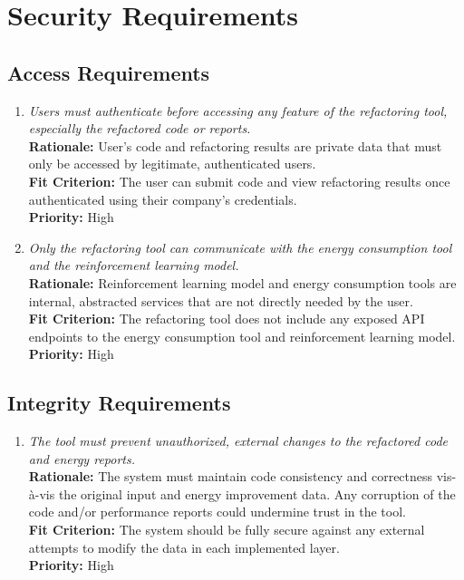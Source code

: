 \documentclass[12pt]{article}
\begin{document}
\section{Security Requirements}
\subsection{Access Requirements}
\begin{enumerate}[label=SR-AR \arabic*., wide=0pt, leftmargin=*]
	\item \emph{Users must authenticate before accessing any feature of the refactoring tool, especially the refactored code or reports.}\\[2mm]
    {\bf Rationale:} User’s code and refactoring results are private data that must only be accessed by legitimate, authenticated users. \\
    {\bf Fit Criterion:} The user can submit code and view refactoring results once authenticated using their company’s credentials.\\
    {\bf Priority:} High
    \item \emph{Only the refactoring tool can communicate with the energy consumption tool and the reinforcement learning model.}\\
    {\bf Rationale:} Reinforcement learning model and energy consumption tools are internal, abstracted services that are not directly needed by the user.\\
    {\bf Fit Criterion:} The refactoring tool does not include any exposed API endpoints to the energy consumption tool and reinforcement learning model.\\
    {\bf Priority:} High
\end{enumerate}
\subsection{Integrity Requirements}
\begin{enumerate}[label=SR-IR \arabic*., wide=0pt, leftmargin=*]
	\item \emph{The tool must prevent unauthorized, external changes to the refactored code and energy reports.}\\[2mm]
    {\bf Rationale:} The system must maintain code consistency and correctness vis-à-vis the original input and energy improvement data. Any corruption of the code and/or performance reports could undermine trust in the tool.\\
    {\bf Fit Criterion:} The system should be fully secure against any external attempts to modify the data in each implemented layer.\\
    {\bf Priority:} High
\end{enumerate}
\end{document}
